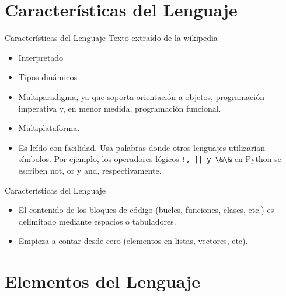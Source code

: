 \documentclass[handout,hyperref={colorlinks=true}]{beamer}
\begin{document}
\section{Características del Lenguaje}
\begin{frame}{Características del Lenguaje}
\onslide<+->Texto extraído de la \href{http://es.wikipedia.org/wiki/Python\#Elementos_del_lenguaje}{wikipedia}
\begin{itemize}
\item<+-> Interpretado
\item<+-> Tipos dinámicos
\item<+->  Multiparadigma, ya que soporta orientación a objetos, programación imperativa y, en menor medida, programación funcional.
\item<+-> Multiplataforma.

\item<+-> Es leído con facilidad. Usa  palabras donde otros lenguajes utilizarían símbolos. Por ejemplo, los operadores lógicos \verb~!, || y \&\&~ en Python se escriben not, or y and, respectivamente.

\end{itemize}

\end{frame}




\begin{frame}{Características del Lenguaje}

\begin{itemize}

\item<+->  El contenido de los bloques de código (bucles, funciones, clases, etc.) es delimitado mediante espacios o tabuladores.

\item<+-> Empieza a contar desde cero (elementos en listas, vectores, etc).



\end{itemize}
\end{frame}



\section{Elementos del Lenguaje}

\end{document}
